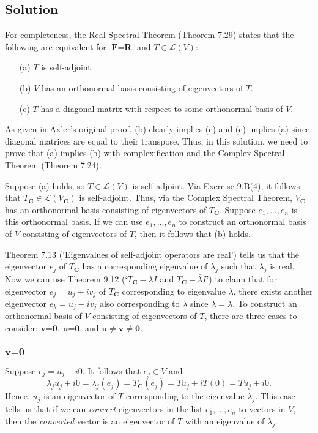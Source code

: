 \documentclass{article}
\begin{document}
\subsection*{Solution}
For completeness, the Real Spectral Theorem (Theorem 7.29) states that the following are equivalent for $\textbf{F}=\textbf{R}$ and $T\in\mathcal{L}(V)$:
\begin{enumerate}
  \item[(a)] $T$ is self-adjoint
  \item[(b)] $V$ has an orthonormal basis consisting of eigenvectors of $T$.
  \item[(c)] $T$ has a diagonal matrix with respect to some orthonormal basis of $V$.
\end{enumerate}
As given in Axler's original proof, (b) clearly implies (c) and (c) implies (a) since diagonal matrices are equal to their transpose. 
Thus, in this solution, we need to prove that (a) implies (b) with complexification and the Complex Spectral Theorem (Theorem 7.24).

Suppose (a) holds, so $T\in\mathcal{L}(V)$ is self-adjoint. 
Via Exercise 9.B(4), it follows that $T_{\textbf{C}}\in\mathcal{L}(V_{\textbf{C}})$ is self-adjoint. 
Thus, via the Complex Spectral Theorem, $V_{\textbf{C}}$ has an orthonormal basis consisting of eigenvectors of $T_{\textbf{C}}$. Suppose $e_1,\ldots,e_n$ is this orthonormal basis. 
If we can use $e_1,\ldots,e_n$ to construct an orthonormal basis of $V$ consisting of eigenvectors of $T$, then it follows that (b) holds.

Theorem 7.13 (`Eigenvalues of self-adjoint operators are real') tells us that the eigenvector $e_j$ of $T_{\textbf{C}}$ has a corresponding eigenvalue of $\lambda_j$ such that $\lambda_j$ is real. 
Now we can use Theorem 9.12 (`$T_{\textbf{C}}-\lambda I$ and $T_{\textbf{C}}-\bar{\lambda} I$') to claim that for eigenvector $e_j=u_j+iv_j$ of $T_{\textbf{C}}$ corresponding to eigenvalue $\lambda$, there exists another eigenvector $e_k=u_j-iv_j$ also corresponding to $\lambda$ since $\lambda=\bar{\lambda}$. 
To construct an orthonormal basis of $V$ consisting of eigenvectors of $T$, there are three cases to consider: $\textbf{v=0}$, $\textbf{u=0}$, and $\textbf{u}\neq\textbf{v}\neq\textbf{0}$.

\subsubsection*{$\textbf{v=0}$}
Suppose $e_j=u_j+i0$. It follows that $e_j\in V$ and 
\[\lambda_ju_j+i0=\lambda_j(e_j)=T_{\mathbf{C}}(e_j)=Tu_j+iT(0)=Tu_j+i0.\]
Hence, $u_j$ is an eigenvector of $T$ corresponding to the eigenvalue $\lambda_j$. 
This case tells us that if we can \textit{convert} eigenvectors in the list $e_1,\ldots,e_n$ to vectors in $V$, then the \textit{converted} vector is an eigenvector of $T$ with an eigenvalue of $\lambda_j$.
\end{document}
